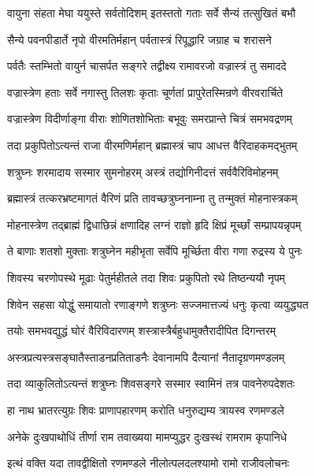 \twolineshloka
{वायुना संहता मेघा ययुस्ते सर्वतोदिशम्}
{इतस्ततो गताः सर्वे सैन्यं तत्सुखितं बभौ}%

\twolineshloka
{सैन्ये पवनपीडार्ते नृपो वीरमतिर्महान्}
{पर्वतास्त्रं रिपूद्धारि जग्राह च शरासने}%

\twolineshloka
{पर्वतैः स्तम्भितो वायुर्न चासर्पत सङ्गरे}
{तद्वीक्ष्य रामावरजो वज्रास्त्रं तु समाददे}%

\twolineshloka
{वज्रास्त्रेण हताः सर्वे नगास्तु तिलशः कृताः}
{चूर्णतां प्रापुरेतस्मिन्रणे वीरवरार्चिते}%

\twolineshloka
{वज्रास्त्रेण विदीर्णाङ्गा वीराः शोणितशोभिताः}
{बभूवुः समरप्रान्ते चित्रं समभवद्रणम्}%

\twolineshloka
{तदा प्रकुपितोऽत्यन्तं राजा वीरमणिर्महान्}
{ब्रह्मास्त्रं चाप आधत्त वैरिदाहकमद्भुतम्}%

\twolineshloka
{शत्रुघ्नः शरमादाय सस्मार सुमनोहरम्}
{अस्त्रं तद्योगिनीदत्तं सर्ववैरिविमोहनम्}%

\twolineshloka
{ब्रह्मास्त्रं तत्करभ्रष्टमागतं वैरिणं प्रति}
{तावच्छत्रुघ्ननाम्ना तु तन्मुक्तं मोहनास्त्रकम्}%

\twolineshloka
{मोहनास्त्रेण तद्ब्राह्मं द्विधाछिन्नं क्षणादिह}
{लग्नं राज्ञो हृदि क्षिप्रं मूर्च्छां सम्प्रापयन्नृपम्}%

\twolineshloka
{ते बाणाः शतशो मुक्ताः शत्रुघ्नेन महीभृता}
{सर्वेपि मूर्च्छिता वीरा गणा रुद्रस्य ये पुनः}%

\twolineshloka
{शिवस्य चरणोपस्थे मूढाः पेतुर्महीतले}
{तदा शिवः प्रकुपितो रथे तिष्ठन्ययौ नृपम्}%

\twolineshloka
{शिवेन सहसा योद्धुं समायातो रणाङ्गणे}
{शत्रुघ्नः सज्जमात्तज्यं धनुः कृत्वा व्ययुद्ध्यत}%

\twolineshloka
{तयोः समभवद्युद्धं घोरं वैरिविदारणम्}
{शस्त्रास्त्रैर्बहुधामुक्तैरादीपित दिगन्तरम्}%

\twolineshloka
{अस्त्रप्रत्यस्त्रसङ्घातैस्ताडनप्रतिताडनैः}
{देवानामपि दैत्यानां नैतादृग्रणमण्डलम्}%

\twolineshloka
{तदा व्याकुलितोऽत्यन्तं शत्रुघ्नः शिवसङ्गरे}
{सस्मार स्वामिनं तत्र पावनेरुपदेशतः}%

\twolineshloka
{हा नाथ भ्रातरत्युग्रः शिवः प्राणापहारणम्}
{करोति धनुरुद्यम्य त्रायस्व रणमण्डले}%

\twolineshloka
{अनेके दुःखपाथोधिं तीर्णा राम तवाख्यया}
{मामप्युद्धर दुःखस्थं रामराम कृपानिधे}%

\twolineshloka
{इत्थं वक्ति यदा तावद्वीक्षितो रणमण्डले}
{नीलोत्पलदलश्यामो रामो राजीवलोचनः}%

